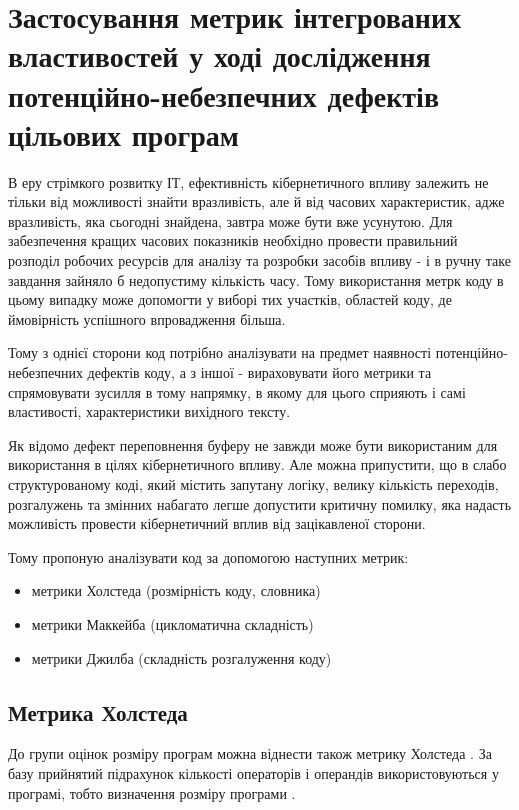 \pagebreak

\section{Застосування метрик інтегрованих властивостей у ході дослідження потенційно-небезпечних дефектів цільових програм}
\label{2section:id8}
В еру стрімкого розвитку ІТ, ефективність кібернетичного впливу залежить не тільки від можливості знайти вразливість, але й від часових характеристик, адже вразливість, яка сьогодні знайдена, завтра може бути вже усунутою. Для забезпечення кращих часових показників необхідно провести правильний розподіл робочих ресурсів для аналізу та розробки засобів впливу - і в ручну таке завдання зайняло б недопустиму кількість часу. Тому використання метрк коду в цьому випадку може допомогти у виборі тих участків, областей коду, де ймовірність успішного впровадження більша.

Тому з однієї сторони код потрібно аналізувати на предмет наявності потенційно-небезпечних дефектів коду, а з іншої - вираховувати його метрики та спрямовувати зусилля в тому напрямку, в якому для цього сприяють і самі властивості, характеристики вихідного тексту.

Як відомо дефект переповнення буферу не завжди може бути використаним для використання в цілях кібернетичного впливу.
Але можна припустити, що в слабо структурованому коді, який містить запутану логіку, велику кількість переходів, розгалужень та змінних набагато легше допустити критичну помилку, яка надасть можливість провести кібернетичний вплив від зацікавленої сторони.

Тому пропоную аналізувати код за допомогою наступних метрик: \begin{itemize}
\item {} 
метрики Холстеда (розмірність коду, словника)

\item {} 
метрики Маккейба (цикломатична складність)

\item {} 
метрики Джилба (складність розгалуження коду)

\end{itemize}

\subsection{Метрика Холстеда}
\label{2section:id10}
До групи оцінок розміру програм можна віднести також метрику Холстеда . За базу прийнятий підрахунок кількості операторів і операндів використовуються у програмі, тобто визначення розміру програми .

